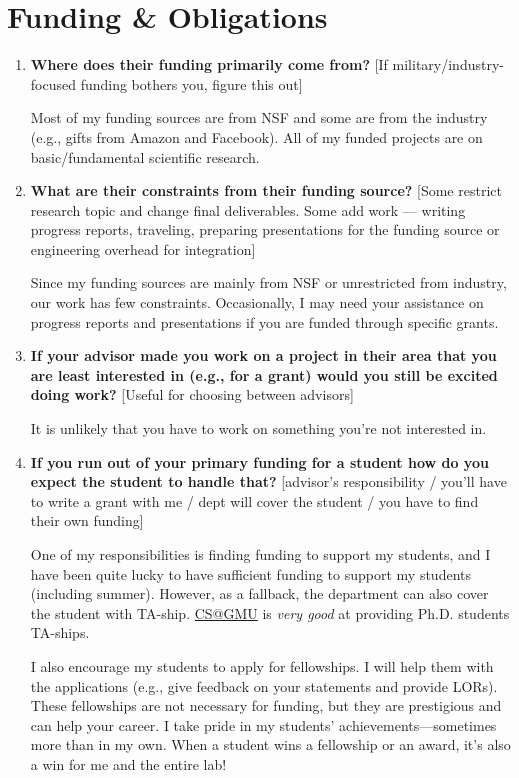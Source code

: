 \documentclass{article}
\begin{document}
\section{Funding \& Obligations}

\begin{enumerate}[label=\arabic*.]
    \item \textbf{Where does their funding primarily come from?} [If military/industry-focused funding bothers you, figure this out]  
    
    Most of my funding sources are from NSF and some are from the industry (e.g., gifts from Amazon and Facebook). All of my funded projects are on basic/fundamental scientific research.

    \item \textbf{What are their constraints from their funding source?} [Some restrict research topic and change final deliverables. Some add work — writing progress reports, traveling, preparing presentations for the funding source or engineering overhead for integration]  
    
    Since my funding sources are mainly from NSF or unrestricted from industry, our work has few constraints. Occasionally, I may need your assistance on progress reports and presentations if you are funded through specific grants.

    \item \textbf{If your advisor made you work on a project in their area that you are least interested in (e.g., for a grant) would you still be excited doing work?} [Useful for choosing between advisors]  
    
    It is unlikely that you have to work on something you're not interested in.

    \item \textbf{If you run out of your primary funding for a student how do you expect the student to handle that?} [advisor's responsibility / you'll have to write a grant with me / dept will cover the student / you have to find their own funding]  
    
    One of my responsibilities is finding funding to support my students, and I have been quite lucky to have sufficient funding to support my students (including summer). However, as a fallback, the department can also cover the student with TA-ship. \href{https://github.com/dynaroars/dynaroars.github.io/wiki/About-GMU}{CS@GMU} is \textit{very good} at providing Ph.D. students TA-ships.

    I also encourage my students to apply for fellowships. I will help them with the applications (e.g., give feedback on your statements and provide LORs). These fellowships are not necessary for funding, but they are prestigious and can help your career. I take pride in my students' achievements---sometimes more than in my own. When a student wins a fellowship or an award, it's also a win for me and the entire lab!
\end{enumerate}
\end{document}

